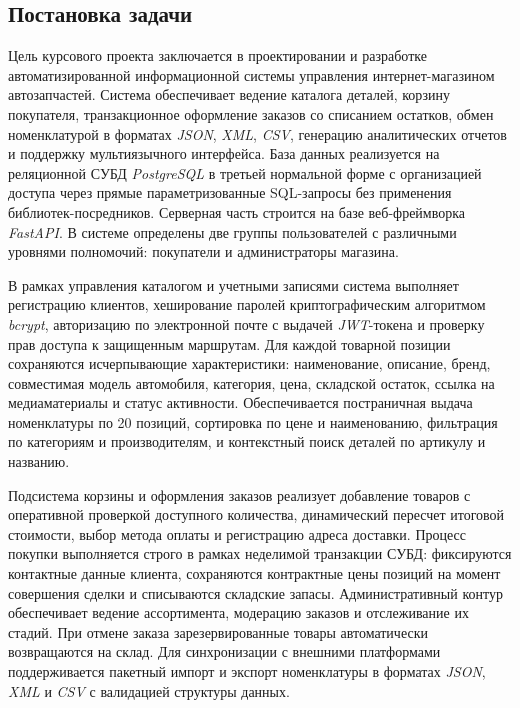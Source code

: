 \subsection{Постановка задачи}
\label{sec:analysis:specification}

Цель курсового проекта заключается в проектировании и разработке автоматизированной информационной системы управления интернет-магазином автозапчастей. Система обеспечивает ведение каталога деталей, корзину покупателя, транзакционное оформление заказов со списанием остатков, обмен номенклатурой в форматах \textit{JSON}, \textit{XML}, \textit{CSV}, генерацию аналитических отчетов и поддержку мультиязычного интерфейса. База данных реализуется на реляционной СУБД \textit{PostgreSQL} в третьей нормальной форме с организацией доступа через прямые параметризованные SQL-запросы без применения библиотек-посредников. Серверная часть строится на базе веб-фреймворка \textit{FastAPI}. В системе определены две группы пользователей с различными уровнями полномочий: покупатели и администраторы магазина.

В рамках управления каталогом и учетными записями система выполняет регистрацию клиентов, хеширование паролей криптографическим алгоритмом \textit{bcrypt}, авторизацию по электронной почте с выдачей \textit{JWT}-токена и проверку прав доступа к защищенным маршрутам. Для каждой товарной позиции сохраняются исчерпывающие характеристики: наименование, описание, бренд, совместимая модель автомобиля, категория, цена, складской остаток, ссылка на медиаматериалы и статус активности. Обеспечивается постраничная выдача номенклатуры по 20 позиций, сортировка по цене и наименованию, фильтрация по категориям и производителям, и контекстный поиск деталей по артикулу и названию.

Подсистема корзины и оформления заказов реализует добавление товаров с оперативной проверкой доступного количества, динамический пересчет итоговой стоимости, выбор метода оплаты и регистрацию адреса доставки. Процесс покупки выполняется строго в рамках неделимой транзакции СУБД: фиксируются контактные данные клиента, сохраняются контрактные цены позиций на момент совершения сделки и списываются складские запасы. Административный контур обеспечивает ведение ассортимента, модерацию заказов и отслеживание их стадий. При отмене заказа зарезервированные товары автоматически возвращаются на склад. Для синхронизации с внешними платформами поддерживается пакетный импорт и экспорт номенклатуры в форматах \textit{JSON}, \textit{XML} и \textit{CSV} с валидацией структуры данных.

